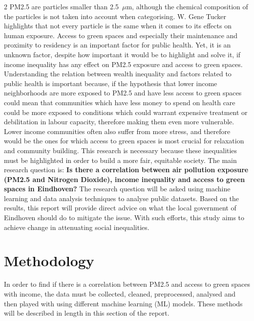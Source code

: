 \documentclass[12pt, a4paper]{article}
\begin{document}
\begin{multicols}{2}
    PM2.5 are particles smaller than 2.5~\(\mu\)m, although the chemical composition of the particles is not taken into account when categorising. W. Gene Tucker highlights that not every particle is the same when it comes to its effects on human exposure. Access to green spaces and especially their maintenance and proximity to residency is an important factor for public health. Yet, it is an unknown factor, despite how important it would be to highlight and solve it, if income inequality has any effect on PM2.5 exposure and access to green spaces. Understanding the relation between wealth inequality and factors related to public health is important because, if the hypothesis that lower income neighborhoods are more exposed to PM2.5 and have less access to green spaces could mean that communities which have less money to spend on health care could be more exposed to conditions which could warrant expensive treatment or debilitation in labour capacity, therefore making them even more vulnerable. Lower income communities often also suffer from more stress, and therefore would be the ones for which access to green spaces is most crucial for relaxation and community building. This research is necessary because these inequalities must be highlighted in order to build a more fair, equitable society.
    The main research question is: \textbf{Is there a correlation between air pollution exposure (PM2.5 and Nitrogen Dioxide), income inequality and access to green spaces in Eindhoven?}
    The research question will be asked using machine learning and data analysis techniques to analyse public datasets. Based on the results, this report will provide direct advice on what the local government of Eindhoven should do to mitigate the issue. With such efforts, this study aims to achieve change in attenuating social inequalities.
    \section{Methodology}
    In order to find if there is a correlation between PM2.5 and access to green spaces with income, the data must be collected, cleaned, preprocessed, analysed and then played with using different machine learning (ML) models. These methods will be described in length in this section of the report.

\end{multicols}
\end{document}
